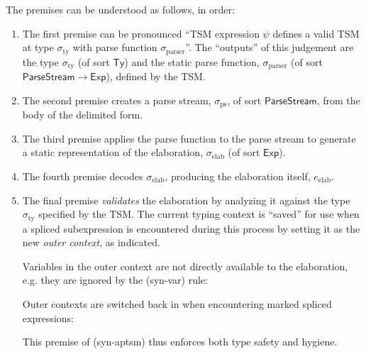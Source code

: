 The premises can be understood as follows, in order:
\begin{enumerate}
\item The first premise can be pronounced ``TSM expression $\psi$ defines a valid TSM at type $\sigma_\text{ty}$ with parse function $\sigma_\text{parser}$''.  The ``outputs'' of this judgement are the type $\sigma_\text{ty}$ (of sort $\mathsf{Ty}$) and the static parse function, $\sigma_\text{parser}$ (of sort $\mathsf{ParseStream} \rightarrow \mathsf{Exp}$), defined by the TSM.%
\item The second premise creates a parse stream, $\sigma_\text{ps}$, of sort $\mathsf{ParseStream}$, from the body of the delimited form.
\item The third premise applies the parse function to the parse stream to generate a static representation of the elaboration, $\sigma_\text{elab}$ (of sort $\mathsf{Exp}$).%
\item The fourth premise decodes $\sigma_\text{elab}$, producing the elaboration itself, $e_\text{elab}$.
\item The final premise \emph{validates} the elaboration by analyzing it against the type $\sigma_\text{ty}$ specified by the TSM. The {current} typing context is ``saved'' for use when a spliced subexpression is encountered during this process by setting it as the new \emph{outer context}, as indicated.

Variables in the outer context are not directly available to the elaboration, e.g. they are ignored by the (syn-var) rule:
\begin{mathpar}
\end{mathpar}

Outer contexts are switched back in when encountering marked spliced expressions:
\begin{mathpar}

\end{mathpar}


This premise of (syn-aptsm) thus enforces both type safety and hygiene.

\end{enumerate}
